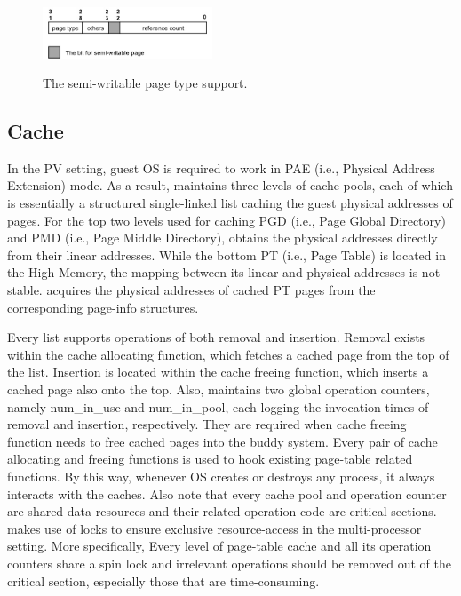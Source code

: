 \begin{figure}[ht]
\centering
\includegraphics[width=0.45\textwidth]{image/implementation/field-of-semi-type.jpg} \\
\caption{The semi-writable page type support.}
\label{fig:field-of-semi-type}
\end{figure}

\subsection{\name Cache}
In the PV setting, guest OS is required to work in PAE (i.e., Physical Address Extension) mode. As a result, \name maintains three levels of cache pools, each of which is essentially a structured single-linked list caching the guest physical addresses of pages. For the top two levels used for caching PGD (i.e., Page Global Directory) and PMD (i.e., Page Middle Directory), \name obtains the physical addresses directly from their linear addresses. While the bottom PT (i.e., Page Table) is located in the High Memory, the mapping between its linear and physical addresses is not stable. \name acquires the physical addresses of cached PT pages from the corresponding page-info structures.

Every list supports operations of both removal and insertion. Removal exists within the cache allocating function, which fetches a cached page from the top of the list. Insertion is located within the cache freeing function, which inserts a cached page also onto the top. Also, \name maintains two global operation counters, namely num\_in\_use and num\_in\_pool, each logging the invocation times of removal and insertion, respectively. They are required when cache freeing function needs to free cached pages into the buddy system. Every pair of cache allocating and freeing functions is used to hook existing page-table related functions. By this way, whenever OS creates or destroys any process, it always interacts with the caches. Also note that every cache pool and operation counter are shared data resources and their related operation code are critical sections. \name makes use of locks to ensure exclusive resource-access in the multi-processor setting. More specifically, Every level of page-table cache and all its operation counters share a spin lock and irrelevant operations should be removed out of the critical section, especially those that are time-consuming.

